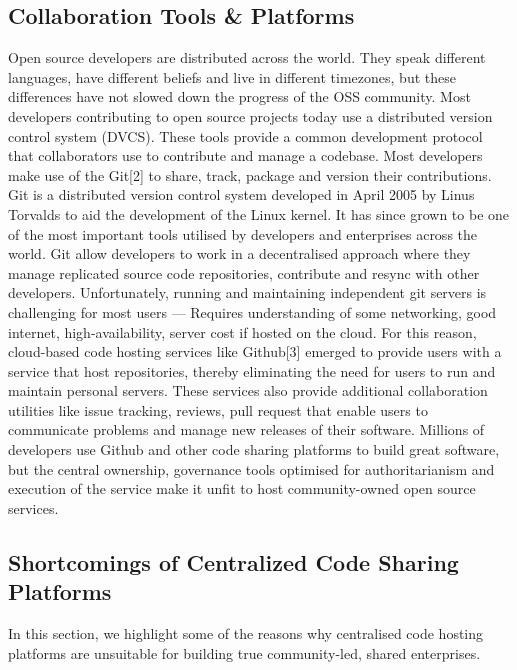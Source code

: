 \subsection{Collaboration Tools \& Platforms}
Open source developers are distributed across the world. They speak different languages, have different beliefs and live in different timezones, but these differences have not slowed down the progress of the OSS community. Most developers contributing to open source projects today use a distributed version control system (DVCS). These tools provide a common development protocol that collaborators use to contribute and manage a codebase. Most developers make use of the Git[2] to share, track, package and version their contributions. Git is a distributed version control system developed in April 2005 by Linus Torvalds to aid the development of the Linux kernel. It has since grown to be one of the most important tools utilised by developers and enterprises across the world. Git allow developers to work in a decentralised approach where they manage replicated source code repositories, contribute and resync with other developers. Unfortunately, running and maintaining independent git servers is challenging for most users — Requires understanding of some networking, good internet, high-availability, server cost if hosted on the cloud. For this reason, cloud-based code hosting services like Github[3] emerged to provide users with a service that host repositories, thereby eliminating the need for users to run and maintain personal servers. These services also provide additional collaboration utilities like issue tracking, reviews, pull request that enable users to communicate problems and manage new releases of their software. Millions of developers use Github and other code sharing platforms to build great software, but the central ownership, governance tools optimised for authoritarianism and execution of the service make it unfit to host community-owned open source services.


\subsection{Shortcomings of Centralized Code Sharing Platforms}
In this section, we highlight some of the reasons why centralised code hosting platforms are unsuitable for building true community-led, shared enterprises.

